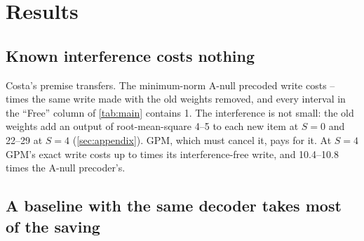 \section{Results}
\label{sec:results}

\begin{table}[t]
  \centering
  \caption{\textbf{Known old weights are free for the precoder, but the pre-registered test fails in \nkilled{} of \nconfigs{} configurations.}
  Columns 3--5: exact-write norm relative to GPM with modular descent (below 1 is cheaper).
  ``Free'': the A-null dirty-paper write's norm divided by the same write's norm with the old weights removed (Costa predicts 1).
  \(\Delta\) test: the pre-registered paired gain in budget-averaged new-task accuracy (pp) of the best dirty-paper arm over the best projection arm; the idea passes only if the interval is above zero and the mean is at least 1~pp.
  Switch: post hoc, the joint write when the budget covers its exact norm and modular descent otherwise, minus modular descent (pp).
  Means over \nseeds{} seeds with 95\% Student-\(t\) intervals.}
  \label{tab:main}
  \small
  \setlength{\tabcolsep}{3.5pt}
\end{table}

\subsection{Known interference costs nothing}

Costa's premise transfers.
The minimum-norm A-null precoded write costs \cleanmin--\cleanmax{} times the same write made with the old weights removed, and every interval in the ``Free'' column of \cref{tab:main} contains 1.
The interference is not small: the old weights add an output of root-mean-square 4--5 to each new item at \(S=0\) and 22--29 at \(S=4\) (\cref{sec:appendix}).
GPM, which must cancel it, pays for it.
At \(S=4\) GPM's exact write costs up to \gpmcleanmax{} times its interference-free write, and 10.4--10.8 times the A-null precoder's.

\subsection{A baseline with the same decoder takes most of the saving}

